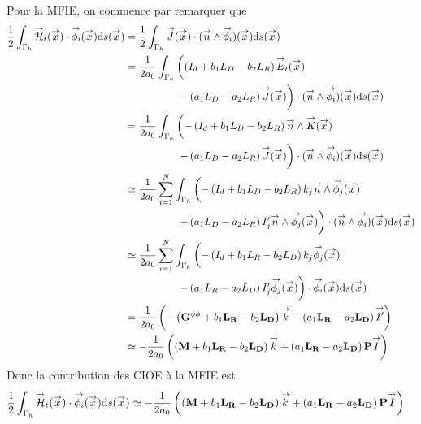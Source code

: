       Pour la MFIE, on commence par remarquer que
      \begin{equation}
        \begin{aligned}
          \frac{1}{2}\int_{\Gamma_h} \vH_t(\vx) \cdot \phii(\vx) \dd{s}(\vx)
          &= \frac{1}{2}\int_{\Gamma_h} \vJ(\vx) \cdot (\vn \pvect \phii)(\vx) \dd{s}(\vx)
          \\
          &= \frac{1}{2a_0}\int_{\Gamma_h} \left( \left(I_d + b_1 L_D - b_2 L_R\right) \vE_t (\vx) \right.
          \\
          & \hspace{5em} \left.- \left(a_1 L_D - a_2 L_R\right) \vJ (\vx) \right) \cdot (\vn \pvect \phii)(\vx) \dd{s}(\vx)
          \\
          &= \frac{1}{2a_0}\int_{\Gamma_h} \left( -\left(I_d + b_1 L_D - b_2 L_R\right) \vn \pvect \vK (\vx) \right.
          \\
          & \hspace{5em} \left.- \left(a_1 L_D - a_2 L_R\right) \vJ (\vx) \right) \cdot (\vn \pvect \phii)(\vx) \dd{s}(\vx)
          \\
          & \simeq \frac{1}{2a_0}\sum_{i=1}^N \int_{\Gamma_h} \left( -\left(I_d + b_1 L_D - b_2 L_R\right) k_j \vn \pvect   \phij (\vx) \right.
          \\
          & \hspace{5em} \left. - \left(a_1 L_D - a_2 L_R\right) I_j' \vn \pvect \phij (\vx) \right) \cdot (\vn \pvect \phii)(\vx) \dd{s}(\vx)
          \\
          & \simeq \frac{1}{2a_0}\sum_{i=1}^N \int_{\Gamma_h} \left( -\left(I_d + b_1 L_R - b_2 L_D\right) k_j \phij (\vx) \right.
          \\
          & \hspace{5em} \left. - \left(a_1 L_R - a_2 L_D\right) I_j' \phij (\vx) \right) \cdot \phii(\vx) \dd{s}(\vx)
          \\
          & = \frac{1}{2a_0} \left( -\left(\mG{\phi}{\phi} + b_1 \mLR - b_2 \mLD\right) \vect{k}  - \left( a_1 \mLR - a_2 \mLD\right) \vect{I'}\right)
          \\
          & \simeq -\frac{1}{2a_0} \left( \left(\mM + b_1 \mLR - b_2 \mLD\right) \vect{k}  + \left( a_1 \mLR - a_2 \mLD\right) \mPP \vect{I} \right)
        \end{aligned}
      \end{equation}
      Donc la contribution des CIOE à la MFIE est
      \begin{equation}
        \begin{aligned}
          \frac{1}{2}\int_{\Gamma_h} \vH_t(\vx) \cdot \phii(\vx) \dd{s}(\vx)
          &\simeq -\frac{1}{2a_0} \left( \left(\mM + b_1 \mLR - b_2 \mLD\right) \vect{k}  + \left( a_1 \mLR - a_2 \mLD\right) \mPP \vect{I} \right)
        \end{aligned}
      \end{equation}

